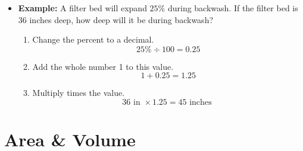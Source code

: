 \begin{itemize}
\item {}

\textbf{Example:} A filter bed will expand $25 \%$ during backwash. If the filter bed is 36 inches deep, how deep will it be during backwash?\\

\begin{enumerate}[Step 1.]
\item Change the percent to a decimal.
$$
25 \% \div 100=0.25
$$
\item Add the whole number 1 to this value.
$$
1+0.25=1.25
$$
\item Multiply times the value.
$$
36 \text { in } \times 1.25=45 \text { inches }
$$
\end{enumerate}
\end{itemize}



%
%
%
%
%









\section{Area \& Volume}

